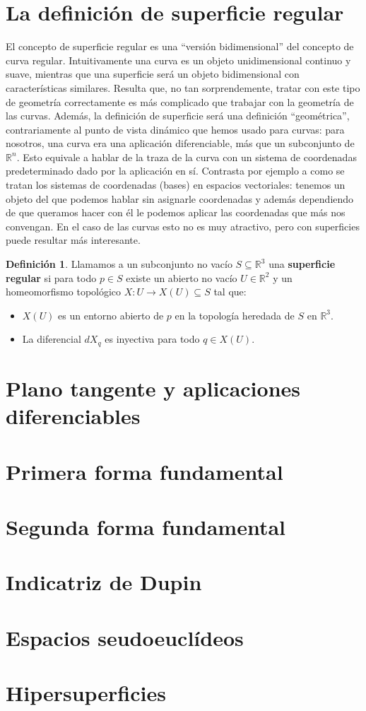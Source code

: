 \documentclass{article}
\theoremstyle{definition}
\newtheorem{define}{Definición}
\newcommand{\reales}{\mathbb{R}}
\begin{document}
\section{La definición de superficie regular}
El concepto de superficie regular es una ``versión bidimensional'' del concepto de curva regular. Intuitivamente una curva es un objeto unidimensional continuo y suave, mientras que una superficie será un objeto bidimensional con características similares. Resulta que, no tan sorprendemente, tratar con este tipo de geometría correctamente es más complicado que trabajar con la geometría de las curvas. Además, la definición de superficie será una definición ``geométrica'', contrariamente al punto de vista dinámico que hemos usado para curvas: para nosotros, una curva era una aplicación diferenciable, más que un subconjunto de $\reales^n$. Esto equivale a hablar de la traza de la curva con un sistema de coordenadas predeterminado dado por la aplicación en sí. Contrasta por ejemplo a como se tratan los sistemas de coordenadas (bases) en espacios vectoriales: tenemos un objeto del que podemos hablar sin asignarle coordenadas y además dependiendo de que queramos hacer con él le podemos aplicar las coordenadas que más nos convengan. En el caso de las curvas esto no es muy atractivo, pero con superficies puede resultar más interesante.

\begin{define}
	Llamamos a un subconjunto no vacío $S \subseteq \reales^3$ una \textbf{superficie regular} si para todo $p \in S$ existe un abierto no vacío $U \in \reales^2$ y un homeomorfismo topológico $X: U \rightarrow X(U) \subseteq S$ tal que:
	\begin{itemize}
		\item
		$X(U)$ es un entorno abierto de $p$ en la topología heredada de $S$ en $\reales^3$.
		\item
		La diferencial $dX_q$ es inyectiva para todo $q \in X(U)$.
	\end{itemize}
\end{define}

\section{Plano tangente y aplicaciones diferenciables}
\section{Primera forma fundamental}
\section{Segunda forma fundamental}
\section{Indicatriz de Dupin}

\section{Espacios seudoeuclídeos}
\section{Hipersuperficies}
\end{document}
